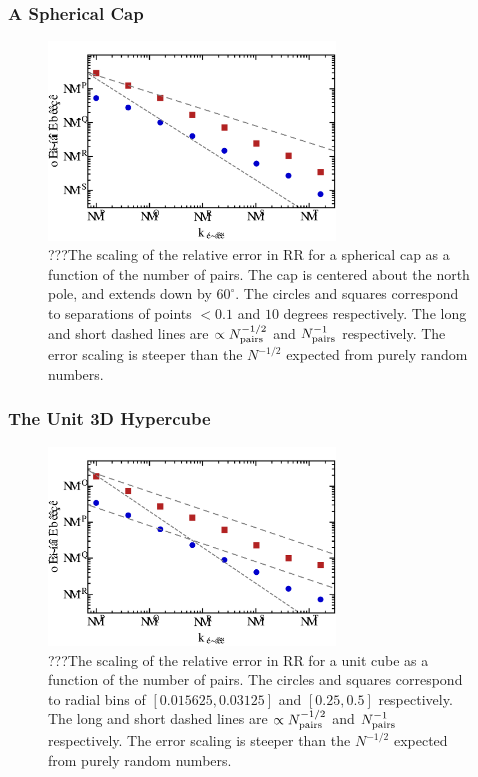 \documentclass[usenatbib]{mn2e}
\begin{document}
\subsubsection{A Spherical Cap}

\begin{figure}
\includegraphics[width=3in]{plots/cap2d}
\caption{???The scaling of the relative error in RR for a spherical cap as a function of the number
of pairs. The cap is centered about the north pole, and extends down by
$60^{\circ}$. The circles and squares correspond to separations of points $<
0.1$ and $10$ degrees respectively. The long and short dashed lines are
$\propto N_{\rm pairs}^{-1/2}$ and $N_{\rm pairs}^{-1}$ respectively. The error
scaling is steeper than the $N^{-1/2}$ expected from purely random numbers.}
\label{fig:cap2d}
\end{figure}


\subsubsection{The Unit 3D Hypercube}

\begin{figure}
\includegraphics[width=3in]{plots/unit3d}
\caption{???The scaling of the relative error in RR for a unit cube as a
function of the number of pairs. The circles and squares correspond to radial
bins of $[0.015625,0.03125]$ and $[0.25,0.5]$ respectively.
The long and short dashed lines are $\propto N_{\rm pairs}^{-1/2}$ and $N_{\rm pairs}^{-1}$ respectively. The error
scaling is steeper than the $N^{-1/2}$ expected from purely random numbers.}
\label{fig:unit3d}
\end{figure}
\end{document}
